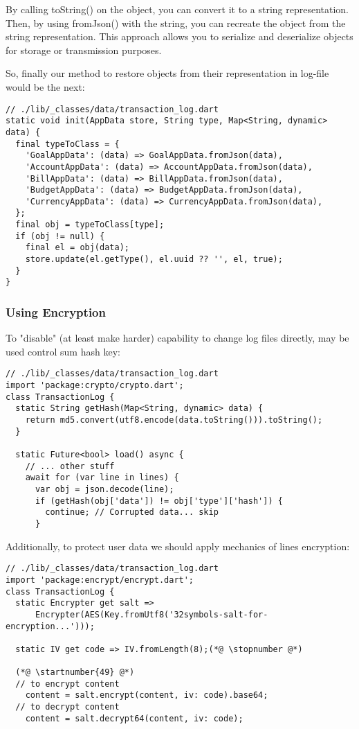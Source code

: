By calling toString() on the object, you can convert it to a string representation. Then, by using fromJson() with the 
string, you can recreate the object from the string representation. This approach allows you to serialize and 
deserialize objects for storage or transmission purposes.

So, finally our method to restore objects from their representation in log-file would be the next:

\begin{lstlisting}[firstnumber=54]
// ./lib/_classes/data/transaction_log.dart
static void init(AppData store, String type, Map<String, dynamic> data) {
  final typeToClass = {
    'GoalAppData': (data) => GoalAppData.fromJson(data),
    'AccountAppData': (data) => AccountAppData.fromJson(data),
    'BillAppData': (data) => BillAppData.fromJson(data),
    'BudgetAppData': (data) => BudgetAppData.fromJson(data),
    'CurrencyAppData': (data) => CurrencyAppData.fromJson(data),
  };
  final obj = typeToClass[type];
  if (obj != null) {
    final el = obj(data);
    store.update(el.getType(), el.uuid ?? '', el, true);
  }
}
\end{lstlisting}



\subsubsection{Using Encryption}

To "disable" (at least make harder) capability to change log files directly, may be used control sum hash key:

\begin{lstlisting}
// ./lib/_classes/data/transaction_log.dart
import 'package:crypto/crypto.dart';
class TransactionLog {
  static String getHash(Map<String, dynamic> data) {
    return md5.convert(utf8.encode(data.toString())).toString();
  }

  static Future<bool> load() async {
    // ... other stuff
    await for (var line in lines) {
      var obj = json.decode(line);
      if (getHash(obj['data']) != obj['type']['hash']) {
        continue; // Corrupted data... skip
      }
\end{lstlisting}

Additionally, to protect user data we should apply mechanics of lines encryption:

\begin{lstlisting}
// ./lib/_classes/data/transaction_log.dart
import 'package:encrypt/encrypt.dart';
class TransactionLog {
  static Encrypter get salt =>
      Encrypter(AES(Key.fromUtf8('32symbols-salt-for-encryption...')));

  static IV get code => IV.fromLength(8);(*@ \stopnumber @*)

  (*@ \startnumber{49} @*)
  // to encrypt content
    content = salt.encrypt(content, iv: code).base64;
  // to decrypt content
    content = salt.decrypt64(content, iv: code);
\end{lstlisting}


